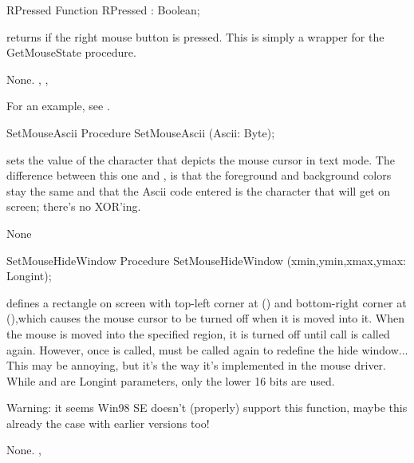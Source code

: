 \begin{function}{RPressed}
\Declaration
Function RPressed  : Boolean;

\Description

 returns  if the right mouse button is pressed.
This is simply a wrapper for the GetMouseState procedure.

\Errors
None.
\SeeAlso
{}, , 
\end{function}

For an example, see .

\begin{procedure}{SetMouseAscii}
\Declaration
Procedure SetMouseAscii (Ascii: Byte);

\Description

sets the  value of the character that depicts the mouse cursor in 
text mode.
The difference between this one and , is that the foreground
and background colors stay the same and that the Ascii code entered is the
character that will get on screen; there's no XOR'ing.

\Errors
None
\SeeAlso
{}
\end{procedure}


\begin{procedure}{SetMouseHideWindow}
\Declaration
Procedure SetMouseHideWindow (xmin,ymin,xmax,ymax: Longint);

\Description

defines a rectangle on screen with top-left corner at () and
bottom-right corner at (),which causes the mouse cursor to be 
turned off when it is moved into it.
When the mouse is moved into the specified region, it is turned off until 
call  is called again. However, once  is
called,  must be called again to redefine the hide window... 
This may be annoying, but it's the way it's implemented in the mouse driver.
While  and  are Longint parameters, 
only the lower 16 bits are used.

Warning: it seems Win98 SE doesn't (properly) support this function,
maybe this already the case with earlier versions too!

\Errors
None.
\SeeAlso
{}, 
\end{procedure}

